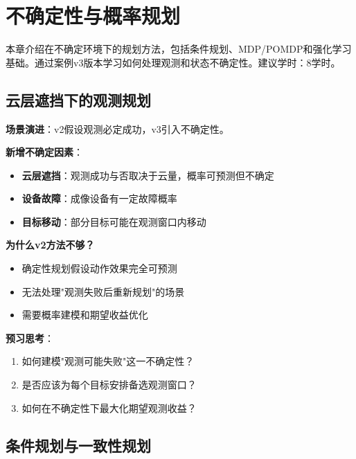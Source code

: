 \chapter{不确定性与概率规划}

\begin{levelbox}
本章介绍在不确定环境下的规划方法，包括条件规划、MDP/POMDP和强化学习基础。通过案例v3版本学习如何处理观测和状态不确定性。建议学时：8学时。
\end{levelbox}

\section{云层遮挡下的观测规划}

\begin{caseboxA}
\textbf{场景演进}：v2假设观测必定成功，v3引入不确定性。

\textbf{新增不确定因素}：
\begin{itemize}
  \item \textbf{云层遮挡}：观测成功与否取决于云量，概率可预测但不确定
  \item \textbf{设备故障}：成像设备有一定故障概率
  \item \textbf{目标移动}：部分目标可能在观测窗口内移动
\end{itemize}

\textbf{为什么v2方法不够？}
\begin{itemize}
  \item 确定性规划假设动作效果完全可预测
  \item 无法处理"观测失败后重新规划"的场景
  \item 需要概率建模和期望收益优化
\end{itemize}

\textbf{预习思考}：
\begin{enumerate}
  \item 如何建模"观测可能失败"这一不确定性？
  \item 是否应该为每个目标安排备选观测窗口？
  \item 如何在不确定性下最大化期望观测收益？
\end{enumerate}
\end{caseboxA}

\section{条件规划与一致性规划}

